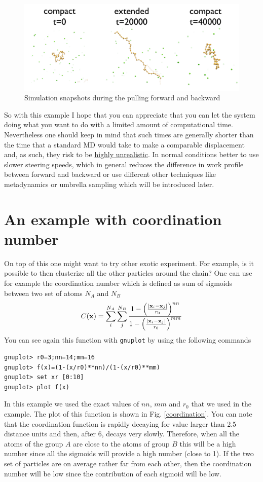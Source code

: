 \documentclass[10pt,fleqn,a4paper]{report}
\begin{document}
\begin{figure}[h!]
\begin{center}
\includegraphics[width=15cm,angle=0]{./figures/compact-extended}
\caption{Simulation snapshots during the pulling forward and backward}
\label{picwork}
\end{center}
\end{figure} 

So with this example I hope that you can appreciate that you can let the system doing what you want to do with a limited amount of computational time. Nevertheless one should keep in mind that such times are generally shorter than the time that a standard MD would take to make a comparable displacement and, as such, they risk to be \uline{highly unrealistic}.
In normal conditions better to use slower steering speeds, which in general reduces the difference in work profile between  forward and backward or use different other techniques like metadynamics or umbrella sampling which will be introduced later.  

\section{An example with coordination number}
On top of this one might want to try other exotic experiment. For example, is it possible to then clusterize all the other particles around the chain?
One can use for example the coordination number which is defined as sum of sigmoids between two set of atoms $N_A$ and $N_B$
\begin{equation}
C({\bf x})=\sum_i^{N_A} \sum_j^{N_B}
\frac{1-\left(\frac{\vert{\bf x}_i - {\bf x}_j \vert}{r_0} \right)^{nn}}{
   1-\left(\frac{\vert{\bf x}_i - {\bf x}_j \vert}{r_0} \right)^{mm} }
\end{equation}
You can see again this function with \texttt{gnuplot}
by using the following commands
\begin{verbatim}
gnuplot> r0=3;nn=14;mm=16
gnuplot> f(x)=(1-(x/r0)**nn)/(1-(x/r0)**mm)
gnuplot> set xr [0:10]
gnuplot> plot f(x)
\end{verbatim}
In this example we used the exact values of $nn$, $mm$ and $r_0$ that we used in the example.
The plot of this function is shown in Fig. \ref{coordination}.
You can note that the coordination function is   rapidly decaying for value larger than 2.5 distance units and then, after 6, decays very slowly. Therefore, when all the atoms of the group $A$ are close to the atoms of group $B$ this will be a high number since all the sigmoids will provide a high number (close to 1). If the two set of particles are on average rather far from each other, then the coordination number will be low since the contribution of each sigmoid will be low.
\end{document}
